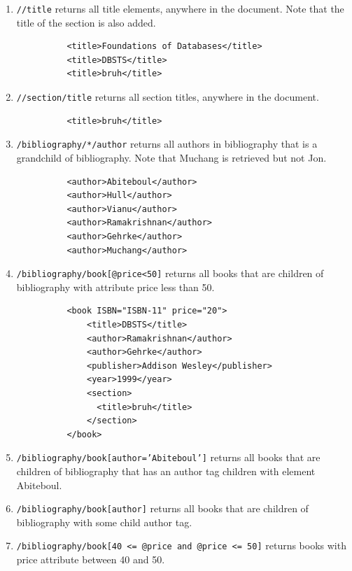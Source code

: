 \begin{example}
\begin{enumerate}
      \item \texttt{//title} returns all title elements, anywhere in the document. Note that the title of the section is also added. 
        \begin{lstlisting}
          <title>Foundations of Databases</title>
          <title>DBSTS</title>
          <title>bruh</title>
        \end{lstlisting}

      \item \texttt{//section/title} returns all section titles, anywhere in the document.
        \begin{lstlisting}
          <title>bruh</title>
        \end{lstlisting}

      \item \texttt{/bibliography/*/author} returns all authors in bibliography that is a grandchild of bibliography. Note that Muchang is retrieved but not Jon. 
        \begin{lstlisting}
          <author>Abiteboul</author>
          <author>Hull</author>
          <author>Vianu</author>
          <author>Ramakrishnan</author>
          <author>Gehrke</author>
          <author>Muchang</author>
        \end{lstlisting}

      \item \texttt{/bibliography/book[@price<50]} returns all books that are children of bibliography with attribute price less than 50. 
        \begin{lstlisting}
          <book ISBN="ISBN-11" price="20">
              <title>DBSTS</title>
              <author>Ramakrishnan</author>
              <author>Gehrke</author>
              <publisher>Addison Wesley</publisher>
              <year>1999</year>
              <section>
                <title>bruh</title>
              </section>
          </book>
        \end{lstlisting}

      \item \texttt{/bibliography/book[author='Abiteboul']} returns all books that are children of bibliography that has an author tag children with element Abiteboul. 

      \item \texttt{/bibliography/book[author]} returns all books that are children of bibliography with some child author tag. 

      \item \texttt{/bibliography/book[40 <= @price and @price <= 50]} returns books with price attribute between 40 and 50. 


\end{enumerate}
\end{example}
